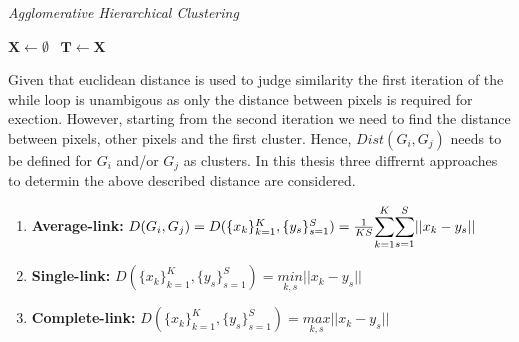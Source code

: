 \documentclass[aodsor,preprint]{imsart}
\numberwithin{equation}{section}
\theoremstyle{plain}
\begin{document}
{}
\begin{algorithm}[hbt!]
	\caption{\textit{Agglomerative Hierarchical Clustering}}\label{alg:one}
	$\mathbf{X} \gets \emptyset$\ 
	$\mathbf{T} \gets \mathbf{X}$
\end{algorithm}

Given that euclidean distance is used to judge similarity the first iteration of the while loop is unambigous as only the distance between pixels is required for exection. However, starting from the second iteration we need to find the distance between pixels, other pixels and the first cluster. Hence, $Dist(G_i, G_j)$ needs to be defined for $G_i$ and/or $G_j$ as clusters. In this thesis three diffrernt approaches to determin the above described distance are considered.

\begin{enumerate}
	\item \textbf{Average-link:} $D(G_i, G_j) = D(\{x_k\}_{k = 1}^K, \{y_s\}_{s = 1}^S) = \frac{1}{KS} \mathlarger{\sum}_{k = 1}^K \mathlarger{\sum}_{s = 1}^S \lvert\lvert x_k - y_s\rvert \rvert$
	
	\item \textbf{Single-link:} $D(\{x_k\}_{k = 1}^K, \{y_s\}_{s = 1}^S) = \underset{k, s}{min} \lvert \lvert x_k - y_s\rvert \rvert$
	
	\item \textbf{Complete-link:}  $D(\{x_k\}_{k = 1}^K, \{y_s\}_{s = 1}^S) = \underset{k, s}{max} \lvert \lvert x_k - y_s\rvert \rvert$
\end{enumerate}
\end{document}
